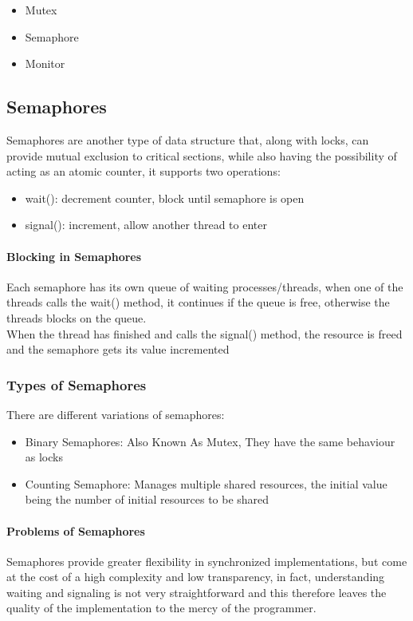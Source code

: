 \documentclass[openright, twoside]{report}
\theoremstyle{definition}
\theoremstyle{example}
\begin{document}
	\begin{itemize}
		\item Mutex
		\item Semaphore
		\item Monitor
	\end{itemize}

	\subsection{Semaphores}
	Semaphores are another type of data structure that, along with locks, can provide 
	mutual exclusion to critical sections, while also having the possibility of acting 
	as an atomic counter, it supports two operations:
	\begin{itemize}
		\item wait(): decrement counter, block until semaphore is open 
		\item signal(): increment, allow another thread to enter
	\end{itemize}

	\paragraph{Blocking in Semaphores}
	Each semaphore has its own queue of waiting processes/threads, when one of the 
	threads calls the wait() method, it continues if the queue is free, 
	otherwise the threads blocks on the queue.\\ 

	When the thread has finished and calls the signal() method, the resource is freed 
	and the semaphore gets its value incremented


	\subsubsection{Types of Semaphores}
	There are different variations of semaphores:
	\begin{itemize}
		\item Binary Semaphores: Also Known As Mutex, 
		They have the same behaviour as locks 
		\item Counting Semaphore: Manages multiple shared resources, the 
		initial value being the number of initial resources to be shared 
	\end{itemize}

	\paragraph{Problems of Semaphores}
	Semaphores provide greater flexibility in synchronized implementations, but come 
	at the cost of a high complexity and low transparency, in fact, understanding 
	waiting and signaling is not very straightforward and this therefore leaves 
	the quality of the implementation to the mercy of the programmer.
\end{document}
